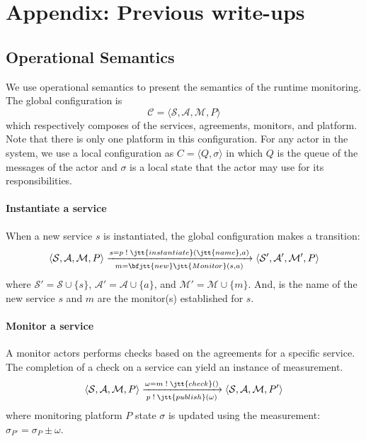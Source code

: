 
\appendix
\label{ch04:appendix}

\newpage

\section{Appendix: Previous write-ups}


\subsection{Operational Semantics} %
\label{ch04:sub:operational_semantics}
We use operational semantics to present the semantics of the runtime monitoring. 
The global configuration is
$$
\mathcal{C} = \langle \mathcal{S}, \mathcal{A}, \mathcal{M}, P \rangle
$$
which respectively composes of the services, agreements, monitors, and platform.
Note that there is only one platform in this configuration.
For any actor in the system, we use a local configuration as $C = \langle Q, \sigma \rangle$ in which $Q$ is the queue of the messages of the actor and $\sigma$ is a local state that the actor may use for its responsibilities.

\paragraph{Instantiate a service} 
When a new service $s$ is instantiated, the global configuration makes a transition:
\[
\langle \mathcal{S}, \mathcal{A}, \mathcal{M}, P \rangle
\xrightarrow[m = \bfjtt{new} \jtt{ Monitor}(s, a)]{s=p \; ! \; \jtt{instantiate}(\jtt{name}, a)}
\langle \mathcal{S'}, \mathcal{A'}, \mathcal{M'}, P \rangle
 \\
\]
where $\mathcal{S'} = \mathcal{S} \cup \{s\}$, $\mathcal{A'} = \mathcal{A} \cup \{a\}$, and $\mathcal{M'} = \mathcal{M} \cup \{m\}$.
And,  is the name of the new service $s$ and $m$ are the monitor(s) established for $s$.

\paragraph{Monitor a service}
A monitor actors performs checks based on the agreements for a specific service.
The completion of a check on a service can yield an instance of measurement.
\[
\langle \mathcal{S}, \mathcal{A}, \mathcal{M}, P \rangle
\xrightarrow[p \; ! \; \jtt{publish}(\omega)]{\omega = m \; ! \; \jtt{check}()}
\langle \mathcal{S}, \mathcal{A}, \mathcal{M}, P' \rangle
\]
where monitoring platform $P$ state $\sigma$ is updated using the measurement: $\sigma_{P'} = \sigma_{P} \pm \omega$.

